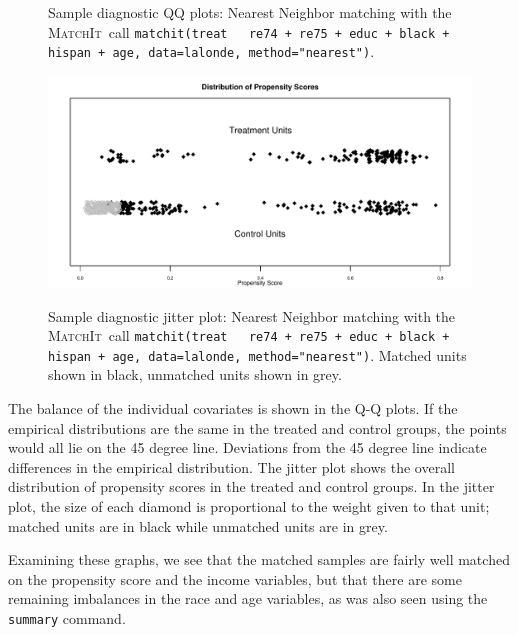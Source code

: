 \documentclass[oneside,letterpaper,titlepage]{article}
\newcommand{\MatchIt}{\textsc{MatchIt}}
\begin{document}
\begin{enumerate}
\begin{figure}[tbp]
\begin{center}
    \hfill
    \caption{Sample diagnostic QQ plots: Nearest Neighbor matching
      with the \MatchIt\ call \texttt{matchit(treat ~ re74 + re75 + educ
        + black + hispan + age, data=lalonde, method="nearest")}.}
\label{diagqqnn}
\end{center}
\end{figure}

\begin{figure}[tbp]
  \begin{center}
    {\includegraphics[scale=0.5]{figs/jitterplotnn}}
    \hfill
    \caption{Sample diagnostic jitter plot: Nearest Neighbor matching
      with the \MatchIt\ call \texttt{matchit(treat ~ re74 + re75 +
        educ + black + hispan + age, data=lalonde, method="nearest")}.
      Matched units shown in black, unmatched units shown in grey.}
\label{diagjitternn}
\end{center}
\end{figure}

The balance of the
individual covariates is shown in the Q-Q plots.
If the empirical distributions are the same in the treated and control groups, the points would all lie on the 45 
degree line.  Deviations from the 45 degree line indicate differences in the empirical distribution.  
The jitter plot shows the overall distribution of propensity scores in the treated and control groups.  In the jitter plot,
the size of each diamond is proportional to the weight given to that unit; matched units are in black while unmatched units
are in grey.

Examining these graphs, we see that the matched samples are fairly well
matched on the propensity score and the income variables, but that there are some remaining
imbalances in the race and age variables, as was also seen using the \texttt{summary} command.  


\end{enumerate}
\end{document}
